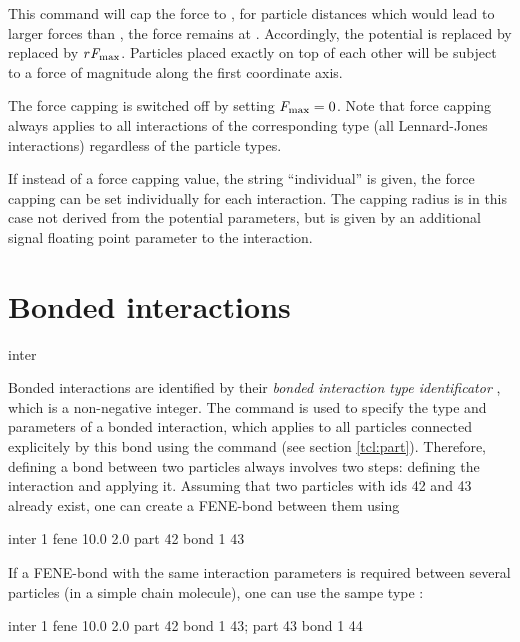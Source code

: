 This command will cap the force to , \ie for
particle distances which would lead to larger forces than
, the force remains at .
Accordingly, the potential is replaced by replaced by $r
\mathrm{\mathit{F_\mathrm{max}}}$. Particles placed exactly on top of each other
will be subject to a force of magnitude  along
the first coordinate axis.

The force capping is switched off by setting $\mathrm{\mathit{F_\mathrm{max}}}=0$.
Note that force capping always applies to all interactions of the
corresponding type (\eg all Lennard-Jones interactions) regardless of
the particle types.

If instead of a force capping value, the string ``individual'' is
given, the force capping can be set individually for each
interaction. The capping radius is in this case not derived from the
potential parameters, but is given by an additional signal floating
point parameter to the interaction.

\section{Bonded interactions}
\label{sec:inter-bonded}

\begin{essyntax*}
  inter 
\end{essyntax*}

 Bonded interactions are identified
by their \emph{bonded interaction type identificator} ,
which is a non-negative integer.  The   command
is used to specify the type and parameters of a bonded interaction,
which applies to all particles connected explicitely by this bond
using the  command (see section \vref{tcl:part}).
Therefore, defining a bond between two particles always involves two
steps: defining the interaction and applying it. Assuming that two
particles with ids 42 and 43 already exist, one can create \eg a
FENE-bond between them using
\begin{tclcode}
  inter 1 fene 10.0 2.0
  part 42 bond 1 43
\end{tclcode}
If a FENE-bond with the same interaction parameters is required between several
particles (\eg in a simple chain molecule), one can use the sampe type :
\begin{tclcode}
  inter 1 fene 10.0 2.0
  part 42 bond 1 43; part 43 bond 1 44 
\end{tclcode}

